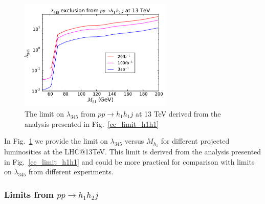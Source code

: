\documentclass[12pt,a4paper]{article}
\begin{document}
\begin{figure}[h!]
\centering
 \includegraphics[width=0.65\textwidth]{./lam345_limit_lhc13.pdf}
\caption{The limit on $\lambda_{345}$ from  $pp \to h_1 h_1 j$ at 13 TeV
derived from the analysis presented in Fig.~\ref{cc_limit_h1h1} \label{lam345_coll_limit}}
\end{figure}


In Fig.~\ref{lam345_coll_limit} we provide the  limit on $\lambda_{345}$ versus $M_{h_1}$ for different projected luminosities at the LHC@13TeV. This limit is derived from the analysis presented in Fig.~\ref{cc_limit_h1h1} and could be more practical 
for comparison with limits on $\lambda_{345}$ from different experiments.


\subsubsection{Limits from $pp\rightarrow h_1h_2 j$}
\end{document}

